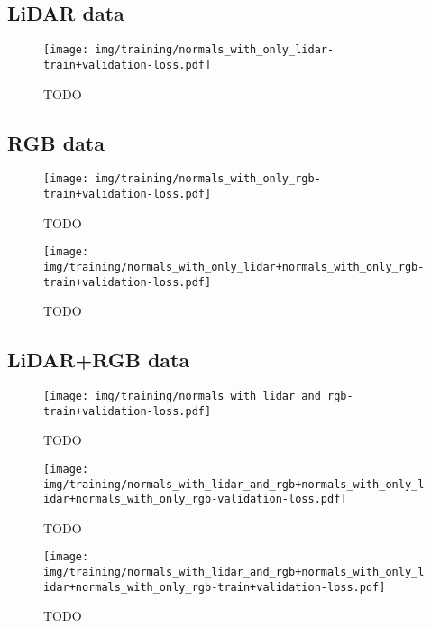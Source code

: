 \subsection{LiDAR data}

\begin{figure}[H]
  \texttt{[image: img/training/normals\_with\_only\_lidar-train+validation-loss.pdf]}
  \caption{TODO}
\end{figure}

\subsection{RGB data}

\begin{figure}[H]
  \texttt{[image: img/training/normals\_with\_only\_rgb-train+validation-loss.pdf]}
  \caption{TODO}
\end{figure}

\begin{figure}[H]
  \texttt{[image: img/training/normals\_with\_only\_lidar+normals\_with\_only\_rgb-train+validation-loss.pdf]}
  \caption{TODO}
\end{figure}

\subsection{LiDAR+RGB data}

\begin{figure}[H]
  \texttt{[image: img/training/normals\_with\_lidar\_and\_rgb-train+validation-loss.pdf]}
  \caption{TODO}
\end{figure}

\begin{figure}[H]
  \texttt{[image: img/training/normals\_with\_lidar\_and\_rgb+normals\_with\_only\_lidar+normals\_with\_only\_rgb-validation-loss.pdf]}
  \caption{TODO}
\end{figure}

\begin{figure}[H]
  \texttt{[image: img/training/normals\_with\_lidar\_and\_rgb+normals\_with\_only\_lidar+normals\_with\_only\_rgb-train+validation-loss.pdf]}
  \caption{TODO}
\end{figure}
